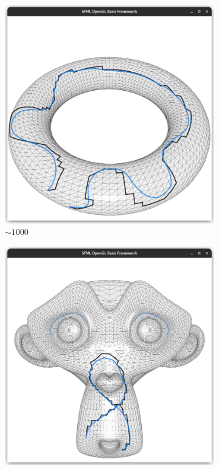 \documentclass{stdlocal}
\begin{document}
\begin{figure}
  \centering
  \begin{subfigure}[b]{0.24\linewidth}
    \centering
    \includegraphics[width=\linewidth,trim={25px 20 25 50},clip]{images/torus-smooth-0.95.png}
    \caption{$\sim 1000$}
  \end{subfigure}
  \begin{subfigure}[b]{0.24\linewidth}
    \centering
    \includegraphics[width=\linewidth,trim={25px 20 25 50},clip]{images/suzanne-smooth-0.95.png}

\end{subfigure}
\end{figure}
\end{document}

